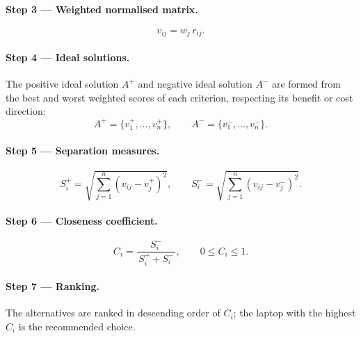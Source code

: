 \paragraph{Step 3 --- Weighted normalised matrix.}
\begin{equation}\label{eq:weighted}
  v_{ij} = w_j \, r_{ij}.
\end{equation}

\paragraph{Step 4 --- Ideal solutions.}
The positive ideal solution $A^{+}$ and negative ideal solution $A^{-}$ are formed from
the best and worst weighted scores of each criterion, respecting its benefit or cost direction:
\begin{equation}\label{eq:pis-nis}
  A^{+} = \{v_1^{+},\dots,v_n^{+}\}, \qquad
  A^{-} = \{v_1^{-},\dots,v_n^{-}\}.
\end{equation}

\paragraph{Step 5 --- Separation measures.}
\begin{equation}\label{eq:sep}
  S_i^{+} = \sqrt{\sum_{j=1}^{n}\left(v_{ij}-v_j^{+}\right)^{2}}, \qquad
  S_i^{-} = \sqrt{\sum_{j=1}^{n}\left(v_{ij}-v_j^{-}\right)^{2}}.
\end{equation}

\paragraph{Step 6 --- Closeness coefficient.}
\begin{equation}\label{eq:closeness}
  C_i = \frac{S_i^{-}}{\,S_i^{+} + S_i^{-}\,}, \qquad 0 \le C_i \le 1.
\end{equation}

\paragraph{Step 7 --- Ranking.}
The alternatives are ranked in descending order of $C_i$; the laptop with the highest
$C_i$ is the recommended choice.
